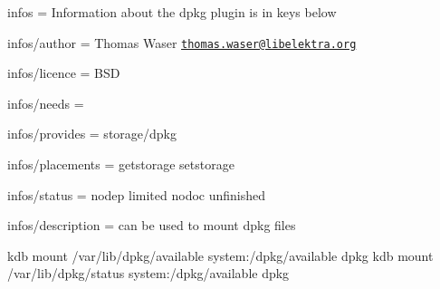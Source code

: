 
\begin{DoxyItemize}
\item infos = Information about the dpkg plugin is in keys below
\item infos/author = Thomas Waser \href{mailto:thomas.waser@libelektra.org}{\tt thomas.\+waser@libelektra.\+org}
\item infos/licence = B\+SD
\item infos/needs =
\item infos/provides = storage/dpkg
\item infos/placements = getstorage setstorage
\item infos/status = nodep limited nodoc unfinished
\item infos/description = can be used to mount dpkg files
\end{DoxyItemize}


\begin{DoxyCode}
kdb mount /var/lib/dpkg/available system:/dpkg/available dpkg
kdb mount /var/lib/dpkg/status system:/dpkg/available dpkg
\end{DoxyCode}
 